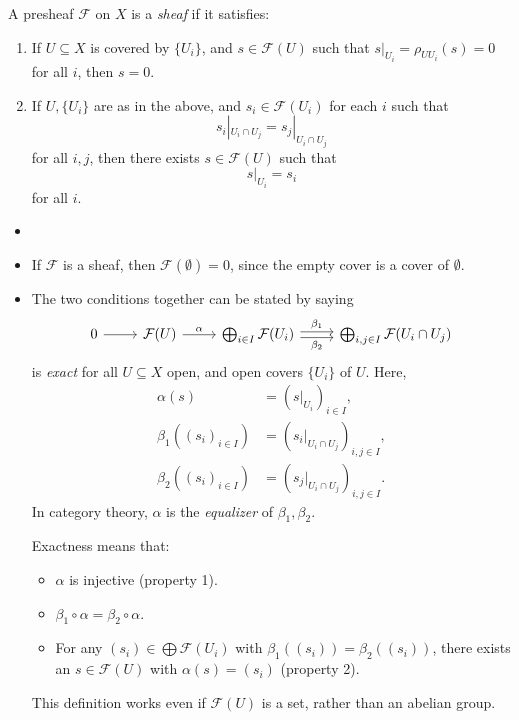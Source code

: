 \documentclass[12pt]{article}
\begin{document}
\begin{definition}
	A presheaf $\mathcal{F}$ on $X$ is a \emph{sheaf} if it satisfies:
	\begin{enumerate}
		\item If $U \subseteq X$ is covered by $\{U_i\}$, and $s \in \mathcal{F}(U)$ such that $s|_{U_i} = \rho_{UU_i}(s) = 0$ for all $i$, then $s = 0$.
		\item If $U, \{U_i\}$ are as in the above, and $s_i \in \mathcal{F}(U_i)$ for each $i$ such that
			\[
			s_i |_{U_i \cap U_j} = s_j|_{U_i \cap U_j}
			\]
			for all $i, j$, then there exists $s \in \mathcal{F}(U)$ such that
			\[
			s|_{U_i} = s_i
			\]
			for all $i$.
	\end{enumerate}
	
\end{definition}


\begin{remark}
	\begin{itemize}
		\item[]
		\item If $\mathcal{F}$ is a sheaf, then $\mathcal{F}(\emptyset) = 0$, since the empty cover is a cover of $\emptyset$.
		\item The two conditions together can be stated by saying
			\[
			\begin{tikzcd}
				0 \arrow[r, ""] & \mathcal{F}(U) \arrow[r, "\alpha"] & \bigoplus_{i \in I} \mathcal{F}(U_i) \arrow[r, "\beta_1", shift left = 2pt] \arrow[r, "\beta_2"', shift right = 2pt] & \bigoplus_{i, j \in I} \mathcal{F}(U_i \cap U_j)
			\end{tikzcd}
			\]
			is \emph{exact} for all $U \subseteq X$ open, and open covers $\{U_i\}$ of $U$. Here,
			\begin{align*}
				\alpha(s) &= (s|_{U_i})_{i \in I}, \\
				\beta_1((s_i)_{i \in I}) &= (s_i|_{U_i \cap U_j} )_{i, j \in I}, \\
				\beta_2((s_i)_{i \in I}) &= (s_j|_{U_i \cap U_j})_{i, j \in I}.
			\end{align*}
			In category theory, $\alpha$ is the \emph{equalizer} of $\beta_1, \beta_2$.

			Exactness means that:
			\begin{itemize}
				\item $\alpha$ is injective (property 1).
				\item $\beta_1 \circ \alpha = \beta_2 \circ \alpha$.
				\item For any $(s_i) \in \bigoplus \mathcal{F}(U_i)$ with $\beta_1((s_i)) = \beta_2((s_i))$, there exists an  $s \in \mathcal{F}(U)$ with $\alpha(s) = (s_i)$ (property 2).
			\end{itemize}
			

			This definition works even if $\mathcal{F}(U)$ is a set, rather than an abelian group.
	\end{itemize}
\end{remark}
\end{document}
